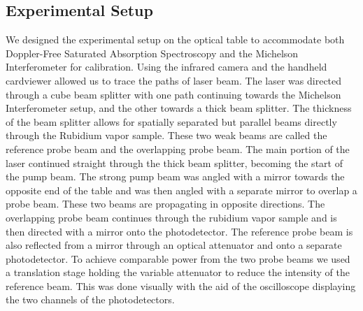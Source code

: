 \documentclass[12pt]{article}
\begin{document}
\subsection*{Experimental Setup}
We designed the experimental setup on the optical table to accommodate both Doppler-Free Saturated Absorption Spectroscopy and the Michelson Interferometer for calibration.  Using the infrared camera and the handheld cardviewer allowed us to trace the paths of laser beam. The laser was directed through a cube beam splitter with one path continuing towards the Michelson Interferometer setup, and the other towards a thick beam splitter. The thickness of the beam splitter allows for spatially separated but parallel beams directly through the Rubidium vapor sample. These two weak beams are called the reference probe beam and the overlapping probe beam. The main portion of the laser continued straight through the thick beam splitter, becoming the start of the pump beam. The strong pump beam was angled with a mirror towards the opposite end of the table and was then angled with a separate mirror to overlap a probe beam. These two beams are propagating in opposite directions. The overlapping probe beam continues through the rubidium vapor sample and is then directed with a mirror onto the photodetector. The reference probe beam is also reflected from a mirror through an optical attenuator and onto a separate photodetector. To achieve comparable power from the two probe beams we used a translation stage holding the variable attenuator to reduce the intensity of the reference beam. This was done visually with the aid of the oscilloscope  displaying the two channels of the photodetectors. 
\end{document}
